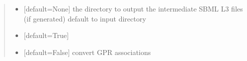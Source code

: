 \documentclass[letterpaper,12pt,english]{sphinxmanual}
\begin{document}
\begin{fulllineitems}
\begin{quote}
\begin{description}
\begin{itemize}
\item {} 
\sphinxAtStartPar
{} \textendash{} {[}default=None{]} the directory to output the intermediate SBML L3 files (if generated) default to input directory

\item {} 
\sphinxAtStartPar
{} \textendash{} {[}default=True{]}

\item {} 
\sphinxAtStartPar
{} \textendash{} {[}default=False{]} convert GPR associations

\end{itemize}

\end{description}\end{quote}

\end{fulllineitems}

\end{document}
